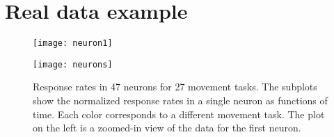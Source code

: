 \clearpage

\section{Real data example}

\begin{figure}[tbh]
    \centering
    \begin{minipage}{0.38\textwidth}
        \begin{center}
            \texttt{[image: neuron1]}
        \end{center}
    \end{minipage}
    \begin{minipage}{0.61\textwidth}
        \begin{center}
            \texttt{[image: neurons]}
        \end{center}
    \end{minipage}
    \caption{
        Response rates in 47 neurons for 27 movement tasks.  The subplots show
        the normalized response rates in a single neuron as functions of time.  
        Each color corresponds to a different movement task.  The plot on
        the left is a zoomed-in view of the data for the first neuron.
    }
\end{figure}

